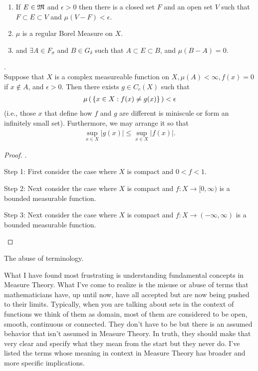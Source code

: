 \documentclass[10pt,a4paper]{report}
\begin{document}
{\begin{theorem}
\begin{enumerate}[label=(\alph*)]
\textbf{Extensions}
	\item If $E \in \mathfrak{M}$ and $\epsilon > 0$ then there is a closed set $F$ and an open set $V$ such that $F \subset E\subset V$ and $\mu(V-F)<\epsilon$.
	\item $\mu$ is a regular Borel Measure on $X$.
	\item and $\exists A \in F_\sigma$ and $B\in G_\delta$ such that $A \subset E \subset B$, and $\mu(B-A) =0$.
	\end{enumerate}
\end{theorem}
\newpage
\begin{theorem}.\\ Suppose that $X$ is a complex measureable function on $X, \mu(A)< \infty, f(x) =0$ if $x \not \in A$, and $\epsilon > 0$.  Then there exists $g \in C_c(X)$ such that 
\begin{align*}
	\mu\left (\, \{x \in X: f(x) \ne g(x) \}  \,\right ) < \epsilon
\end{align*}(i.e., those $x$ that define how $f$ and $g$ are different is miniscule or form an infinitely small set). Furthermore, we may arrange it so that 
\begin{align*}
	\sup_{x\in X} |g(x) |\le \sup_{x\in X}|f(x)|.
\end{align*}

\end{theorem}
\begin{proof}.

	\begin{description}
	\item Step 1: First consider the case where $X$ is compact and $0< f< 1$.
	\item Step 2: Next consider the case where $X$ is compact and $f: X \to [0,\infty)$ is a bounded measurable function.
	\item Step 3: Next consider the case where $X$ is compact and $f: X\to (-\infty, \infty)$ is a bounded measurable function.
	\end{description}
\end{proof}

\newpage
\begin{center}
\Large{The abuse of terminology.}
\end{center}

What I have found most frustrating is understanding fundamental concepts in Measure Theory.  What I've come to realize is the misuse or abuse of terms that mathematicians have, up until now, have all accepted but are now being pushed to their limits.  Typically, when you are talking about sets in the context of functions we think of them as domain, most of them are considered to be open, smooth, continuous or connected.  They don't have to be but there is an assumed behavior that isn't assumed in Measure Theory.  In truth, they should make that very clear and specify what they mean from the start but they never do.  I've listed the terms whose meaning in context in Measure Theory has broader and more specific implications.\\

}
\end{document}

